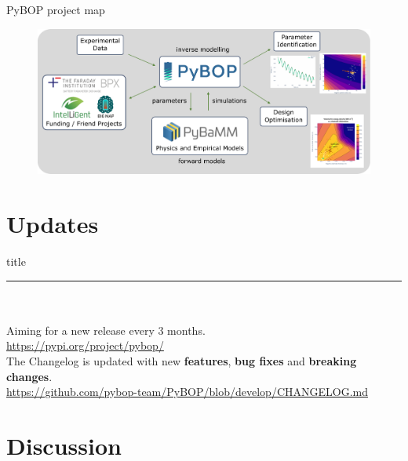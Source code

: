 \documentclass[aspectratio=169]{beamer}
\begin{document}
\begin{frame}{PyBOP project map}
    \vspace{-6mm}
    \begin{figure}
        \centering
        \includegraphics[height=0.42\textwidth]{Images/Diagrams/PyBOP-high-level.pdf}
        \label{fig:project_map}
    \end{figure}
\end{frame}

\section{Updates}

\begin{frame}[plain]
    \centering
    \begin{beamercolorbox}[sep=8pt,center,shadow=true,rounded=true]{title}
    \par%
    \color{oxfordblue}\noindent\rule{10cm}{1pt} \\
    \LARGE{\faCloudUpload} \\
    \vspace{6mm} \normalsize
    Aiming for a new release every 3 months. \\
    \href{https://pypi.org/project/pybop/}{https://pypi.org/project/pybop/} \\
    \vspace{6mm}
    The Changelog is updated with new \textbf{features},  \textbf{bug fixes} and \textbf{breaking changes}. \\
    \href{https://github.com/pybop-team/PyBOP/blob/develop/CHANGELOG.md}{https://github.com/pybop-team/PyBOP/blob/develop/CHANGELOG.md}
    \end{beamercolorbox}
\end{frame}


\section{Discussion}
\end{document}
